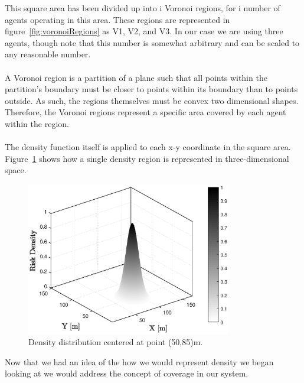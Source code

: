 This square area has been divided up into i Voronoi regions, for i number of agents operating in this area. These regions are represented in figure~\ref{fig:voronoiRegions} as V1, V2, and V3. In our case we are using three agents, though note that this number is somewhat arbitrary and can be scaled to any reasonable number. \\
\\
A Voronoi region is a partition of a plane such that all points within the partition's boundary must be closer to points within its boundary than to points outside. As such, the regions themselves must be convex two dimensional shapes. Therefore, the Voronoi regions represent a specific area covered by each agent within the region. \\
\\ 
The density function itself is applied to each x-y coordinate in the square area. Figure~\ref{fig:contour3Density} shows how a single density region is represented in three-dimensional space.
\begin{figure} [H]
    \centering
    \includegraphics[width=0.8\textwidth]{figs/Matlab/contour3Density.eps}
    \caption{Density distribution centered at point (50,85)m.}
    \label{fig:contour3Density}
\end{figure}

Now that we had an idea of the how we would represent density we began looking at we would address the concept of coverage in our system. \\

